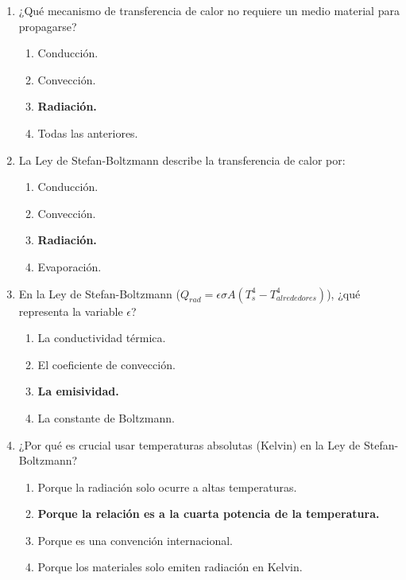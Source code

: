 \documentclass{article}
\begin{document}
\begin{enumerate}[label=\arabic*.]
    \item ¿Qué mecanismo de transferencia de calor no requiere un medio material para propagarse?
    \begin{enumerate}[label=\alph*)]
        \item Conducción.
        \item Convección.
        \item \textbf{Radiación.}
        \item Todas las anteriores.
    \end{enumerate}

    \item La Ley de Stefan-Boltzmann describe la transferencia de calor por:
    \begin{enumerate}[label=\alph*)]
        \item Conducción.
        \item Convección.
        \item \textbf{Radiación.}
        \item Evaporación.
    \end{enumerate}

    \item En la Ley de Stefan-Boltzmann ($Q_{rad} = \epsilon \sigma A (T_s^4 - T_{alrededores}^4)$), ¿qué representa la variable $\epsilon$?
    \begin{enumerate}[label=\alph*)]
        \item La conductividad térmica.
        \item El coeficiente de convección.
        \item \textbf{La emisividad.}
        \item La constante de Boltzmann.
    \end{enumerate}

    \item ¿Por qué es crucial usar temperaturas absolutas (Kelvin) en la Ley de Stefan-Boltzmann?
    \begin{enumerate}[label=\alph*)]
        \item Porque la radiación solo ocurre a altas temperaturas.
        \item \textbf{Porque la relación es a la cuarta potencia de la temperatura.}
        \item Porque es una convención internacional.
        \item Porque los materiales solo emiten radiación en Kelvin.
    \end{enumerate}


\end{enumerate}
\end{document}
